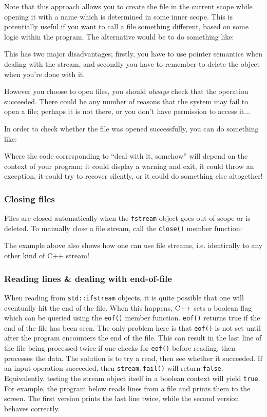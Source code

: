 \documentclass[a4paper]{scrartcl}
\begin{document}
Note that this approach allows you to create the file in the current scope while opening it with a name which is determined in some inner scope. This is potentially useful if you want to call a file something different, based on some logic within the program. The alternative would be to do something like:


This has two major disadvantages; firstly, you have to use pointer semantics when dealing with the stream, and secondly you have to remember to delete the object when you're done with it.

However you choose to open files, you should \emph{always} check that the operation succeeded. There could be any number of reasons that the system may fail to open a file; perhaps it is not there, or you don't have permission to access it...

In order to check whether the file was opened successfully, you can do something like:


Where the code corresponding to ``deal with it, somehow'' will depend on the context of your program; it could display a warning and exit, it could throw an exception, it could try to recover silently, or it could do something else altogether!

\subsubsection{Closing files}
Files are closed automatically when the \verb|fstream| object goes out of scope or is deleted. To manually close a file stream, call the \verb|close()| member function:


The example above also shows how one can use file streams, i.e. identically to any other kind of C++ stream!

\subsubsection{Reading lines \& dealing with end-of-file}
When reading from \verb|std::ifstream| objects, it is quite possible that one will eventually hit the end of the file. When this happens, C++ sets a boolean flag which can be queried using the \verb|eof()| member function. \verb|eof()| returns true if the end of the file has been seen. The only problem here is that \verb|eof()| is not set until after the program encounters the end of the file. This can result in the last line of the file being processed twice if one checks for \verb|eof()| before reading, then processes the data. The solution is to try a read, then see whether it succeeded. If an input operation succeeded, then \verb|stream.fail()| will return \verb|false|. Equivalently, testing the stream object itself in a boolean context will yield \verb|true|. For example, the program below reads lines from a file and prints them to the screen. The first version prints the last line twice, while the second version behaves correctly.
\end{document}
